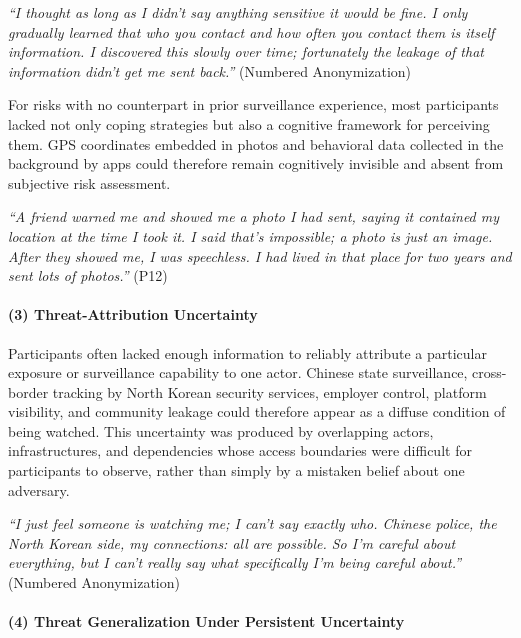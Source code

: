 \documentclass[conference,compsoc]{IEEEtran}
\begin{document}
\begin{displayquote}
\textit{``I thought as long as I didn't say anything sensitive it would be fine. I only gradually learned that who you contact and how often you contact them is itself information. I discovered this slowly over time; fortunately the leakage of that information didn't get me sent back.''} (Numbered Anonymization)
\end{displayquote}

For risks with no counterpart in prior surveillance experience, most participants lacked not only coping strategies but also a cognitive framework for perceiving them. GPS coordinates embedded in photos and behavioral data collected in the background by apps could therefore remain cognitively invisible and absent from subjective risk assessment.

\begin{displayquote}
\textit{``A friend warned me and showed me a photo I had sent, saying it contained my location at the time I took it. I said that's impossible; a photo is just an image. After they showed me, I was speechless. I had lived in that place for two years and sent lots of photos.''} (P12)
\end{displayquote}

\paragraph{\textbf{(3) Threat-Attribution Uncertainty}}
Participants often lacked enough information to reliably attribute a particular exposure or surveillance capability to one actor. Chinese state surveillance, cross-border tracking by North Korean security services, employer control, platform visibility, and community leakage could therefore appear as a diffuse condition of being watched. This uncertainty was produced by overlapping actors, infrastructures, and dependencies whose access boundaries were difficult for participants to observe, rather than simply by a mistaken belief about one adversary.

\begin{displayquote}
\textit{``I just feel someone is watching me; I can't say exactly who. Chinese police, the North Korean side, my connections: all are possible. So I'm careful about everything, but I can't really say what specifically I'm being careful about.''} (Numbered Anonymization)
\end{displayquote}

\paragraph{\textbf{(4) Threat Generalization Under Persistent Uncertainty}}
\end{document}
